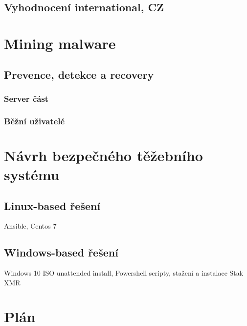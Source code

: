 \documentclass[
  printed, %
  table,   %
  nolof,     %
  nolot,     %
           oneside, color
]{fithesis3}
\begin{document}
\section{Vyhodnocení international, CZ}

 
\chapter{Mining malware}
\section{Prevence, detekce a recovery}
\subsection{Server část}
\subsection{Běžní uživatelé}


\chapter{Návrh bezpečného těžebního systému}
\section{Linux-based řešení}
Ansible, Centos 7
\section{Windows-based řešení}
Windows 10 ISO unattended install, Powershell scripty, stažení a instalace Stak XMR

\chapter{Plán}
\end{document}
